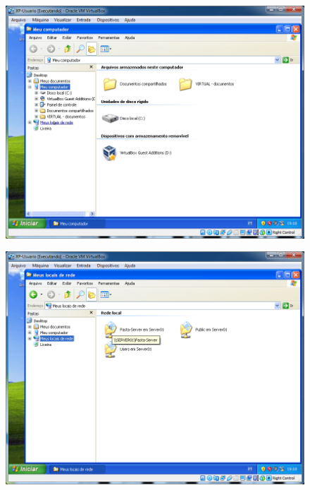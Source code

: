 \documentclass[10pt]{article}
\begin{document}
\begin{figure}[H]
    \centering
    \caption{}
    \label{fig:5122}
    \includegraphics[width=\linewidth]{images/windows_server/compartilhamento/020.png}
\end{figure}
\begin{figure}[H]
    \centering
    \caption{}
    \label{fig:5123}
    \includegraphics[width=\linewidth]{images/windows_server/compartilhamento/021.png}
\end{figure}
\end{document}
